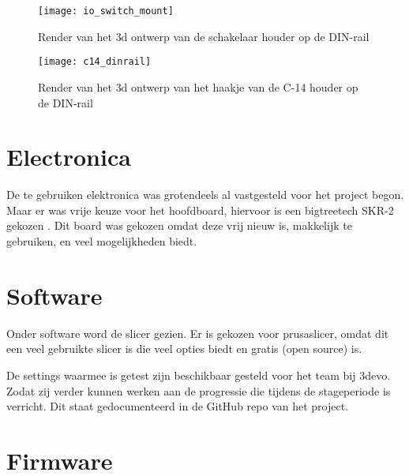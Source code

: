 \begin{figure}[h]
    \centering
    \begin{minipage}{0.45\textwidth}
        \centerline{\texttt{[image: io\_switch\_mount]}}
        \caption{Render van het \ac{3d} ontwerp van de schakelaar houder op de DIN-rail}
        \label{fig:din2}
    \end{minipage}\hfill
    \begin{minipage}{0.45\textwidth}
        \centerline{\texttt{[image: c14\_dinrail]}}
        \caption{Render van het \ac{3d} ontwerp van het haakje van de C-14 houder op de DIN-rail}
        \label{fig:din3}
    \end{minipage}
\end{figure}


\section{Electronica}

De te gebruiken elektronica was grotendeels al vastgesteld voor het project
begon. Maar er was vrije keuze voor het hoofdboard, hiervoor is een
bigtreetech SKR-2 gekozen \cite{btt}. Dit board was gekozen omdat deze vrij
nieuw is, makkelijk te gebruiken, en veel mogelijkheden biedt.

\section{Software}

Onder software word de slicer gezien. Er is gekozen voor prusaslicer, omdat dit
een veel gebruikte slicer is die veel opties biedt en gratis (open source) is.

De settings waarmee is getest zijn beschikbaar gesteld voor het team bij 3devo.
Zodat zij verder kunnen werken aan de progressie die tijdens de stageperiode is
verricht. Dit staat gedocumenteerd in de GitHub repo van het project.

\section{Firmware}

